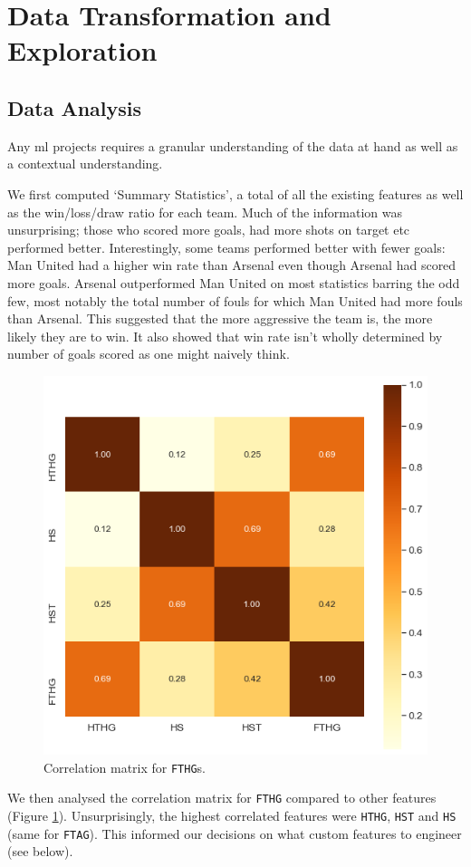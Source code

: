 \documentclass{article}
\newcommand{\sw}[1]{\texttt{#1}}
\begin{document}
\section{Data Transformation and Exploration}
\label{data}
\subsection{Data Analysis}
\label{analysis}
Any \gls{ml} projects requires a granular understanding of the data at hand as well as a contextual understanding. 

We first computed ‘Summary Statistics’, a total of all the existing features as well as the win/loss/draw ratio for each team. Much of the information was unsurprising; those who scored more goals, had more shots on target etc performed better. Interestingly, some teams performed better with fewer goals: Man United had a higher win rate than Arsenal even though Arsenal had scored more goals. Arsenal outperformed Man United on most statistics barring the odd few, most notably the total number of fouls for which Man United had more fouls than Arsenal. This suggested that the more aggressive the team is, the more likely they are to win. It also showed that win rate isn’t wholly determined by number of goals scored as one might naively think. 

\begin{figure}[!htb]
    \centering
    \includegraphics[width=0.5\linewidth]{Images/Figure 1.png}
    \caption{Correlation matrix for \sw{FTHG}s.}
    \label{fig:correlationmatrix}
\end{figure}

We then analysed the correlation matrix for \sw{FTHG} compared to other features (Figure \ref{fig:correlationmatrix}). Unsurprisingly, the highest correlated features were \sw{HTHG}, \sw{HST} and \sw{HS} (same for \sw{FTAG}). This informed our decisions on what custom features to engineer (see below).
\end{document}
